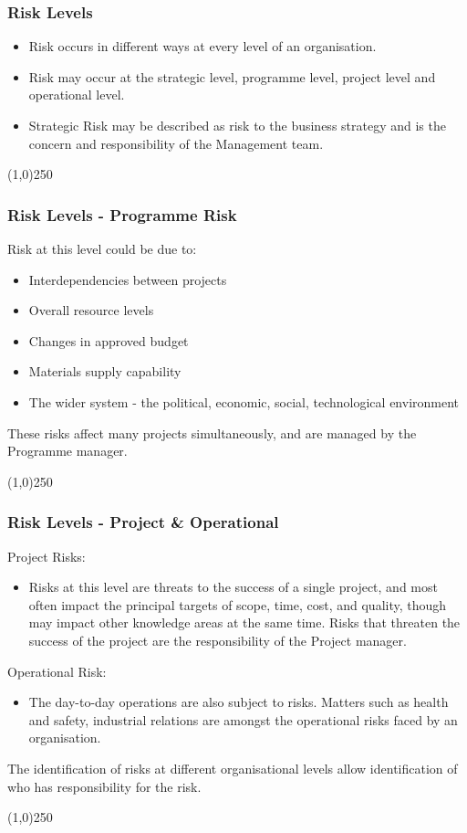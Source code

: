 \begin{frame}
\frametitle{Risk Levels}
\begin{itemize}
	\item Risk occurs in different ways at every level of an organisation.
	\item Risk may occur at the strategic level, programme level, project level and operational level.
	\item Strategic Risk may be described as risk to the business strategy and is the concern and responsibility of the Management team.
\end{itemize}
\end{frame}\begin{center}\line(1,0){250}\end{center}






\begin{frame}
\frametitle{Risk Levels - Programme Risk}
Risk at this level could be due to:
\begin{itemize}
	\item Interdependencies between projects
	\item Overall resource levels
	\item Changes in approved budget
	\item Materials supply capability
	\item The wider system - the political, economic, social, technological environment
\end{itemize}
These risks affect many projects simultaneously, and are managed by the Programme manager.
\end{frame}\begin{center}\line(1,0){250}\end{center}






\begin{frame}
\frametitle{Risk Levels - Project \& Operational}
Project Risks:  
	\begin{itemize}
		\item Risks at this level are threats to the success of a single project, and most often impact the principal targets of scope, time, cost, and quality, though may impact other knowledge areas at the same time. Risks that threaten the success of the project are the responsibility of the Project manager.
	\end{itemize}
Operational Risk: 
	\begin{itemize}
		\item The day-to-day operations are also subject to risks. Matters such as health and safety, industrial relations are amongst the operational risks faced by an organisation.
	\end{itemize}
The identification of risks at different organisational levels allow identification of who has responsibility for the risk.

\end{frame}\begin{center}\line(1,0){250}\end{center}






